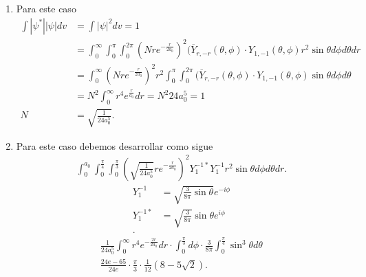 \documentclass{report}
\begin{document}

\sol

\begin{enumerate}
	\item Para este caso
		\begin{align*}
			\int |\psi^*| |\psi| dv &= \int |\psi|^2dv = 1 \\
						&= \int_0^\infty \int_0^\pi\int_0^{2\pi}(Nre^{-\frac{r}{2a_0}})^2(\overline{Y}_{r,-r}(\theta,\phi)\cdot Y_{1,-1}(\theta,\phi)r^2\sin\theta d\phi d\theta dr\\
						&= \int_0^\infty \left( Nre^{-\frac{r}{2a_0}} \right)^2r^2 \int_0^\pi\int_0^{2\pi}(\overline{Y}_{r,-r}(\theta,\phi)\cdot Y_{1,-1}(\theta,\phi)\sin\theta d\phi d\theta\\
						&= N^2\int_0^\infty r^4e^{\frac{r}{a_0}}dr = N^2 24a_0^5=1\\
					N &= \sqrt{\frac{1}{24a_0^5}} 
		.\end{align*}
	\item Para este caso debemos desarrollar como sigue
		\begin{align*}
			\int_0^{a_0}\int_0^{\frac{\pi}{4}}\int_0^{\frac{\pi}{3}}\left( \sqrt{\frac{1}{24a_0^5}}re^{-\frac{r}{2a_0}}  \right)^2Y_1^{-1*}Y_1^{-1}r^2\sin\theta d\phi d\theta dr
		.\end{align*}
		\begin{align*}
			Y_1^{-1} &= \sqrt{\frac{3}{8\pi}\sin\theta} e^{-i\phi} \\
			Y_1^{-1*} &= \sqrt{\frac{3}{8\pi}} \sin\theta e^{i\phi} \\
		.\end{align*}
		\begin{align*}
			\frac{1}{24a_0^5}\int_0^\infty r^4 e^{-\frac{2r}{2a_0}}dr\cdot\int_0^{\frac{\pi}{3}}d\phi\cdot\frac{3}{8\pi}\int_0^{\frac{\pi}{4}}\sin^3\theta d\theta\\
			\frac{24e-65}{24e}\cdot\frac{\pi}{3}\cdot\frac{1}{12}(8-5\sqrt{2} )
		.\end{align*}
\end{enumerate}
\end{document}
